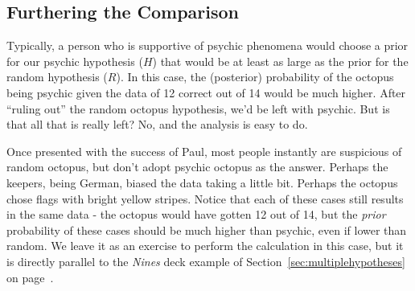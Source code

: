 \subsection{Furthering the Comparison}

Typically, a person who is supportive of psychic phenomena would choose a prior for our psychic hypothesis ($H$) that would be at least as large as the prior for the random hypothesis ($R$).  In this case, the (posterior) probability of the octopus being psychic given the data of 12 correct out of 14 would be much higher.  After ``ruling out'' the random octopus hypothesis, we'd be left with psychic.  But is that all that is really left?  No, and the analysis is easy to do.  

Once presented with the success of Paul, most people instantly are suspicious of random octopus, but don't adopt psychic octopus as the answer.  Perhaps the keepers, being German, biased the data taking a little bit.  Perhaps the octopus chose flags with bright yellow stripes.  Notice that each of these cases still results in the same data - the octopus would have gotten 12 out of 14, but the \emph{prior} probability of these cases should be much higher than psychic, even if lower than random.  We leave it as an exercise to perform the calculation in this case, but it is directly parallel to the \emph{Nines} deck example of Section~\ref{sec:multiplehypotheses} on page~\pageref{sec:multiplehypotheses}.


